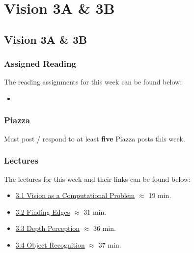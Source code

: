 \clearpage

\renewcommand{\ChapTitle}{Vision 3A \& 3B}
\renewcommand{\SectionTitle}{Vision 3A \& 3B}

\chapter{\ChapTitle}
\section{\SectionTitle}

\subsection{Assigned Reading}

The reading assignments for this week can be found below:

\begin{itemize}
    \item {}
\end{itemize}

\subsection{Piazza}

Must post / respond to at least \textbf{five} Piazza posts this week.  

\subsection{Lectures}

The lectures for this week and their links can be found below:

\begin{itemize}
    \item \href{https://www.youtube.com/watch?v=c8yacaB0TEs}{3.1 Vision as a Computational Problem} $\approx$ 19 min.
    \item \href{https://www.youtube.com/watch?v=4-LCyFr6hRQ}{3.2 Finding Edges} $\approx$ 31 min.
    \item \href{https://www.youtube.com/watch?v=_psVot3Y8Lo}{3.3 Depth Perception} $\approx$ 36 min.
    \item \href{https://www.youtube.com/watch?v=OBm_lyWIm9Q}{3.4 Object Recognition} $\approx$ 37 min.
\end{itemize}

